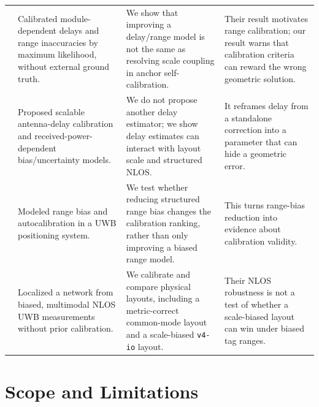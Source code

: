 \documentclass[11pt,a4paper]{article}
\begin{document}
\begin{center}
\begin{longtable}{@{}p{30mm}p{37mm}p{39mm}p{37mm}@{}}
\citet{ledergerber_2018_calibrating_away_inaccuracies_uwb} & Calibrated module-dependent delays and range inaccuracies by maximum likelihood, without external ground truth. & We show that improving a delay/range model is not the same as resolving scale coupling in anchor self-calibration. & Their result motivates range calibration; our result warns that calibration criteria can reward the wrong geometric solution. \\
\citet{shalaby_2023_calibration_and_uncertainty_char} & Proposed scalable antenna-delay calibration and received-power-dependent bias/uncertainty models. & We do not propose another delay estimator; we show delay estimates can interact with layout scale and structured NLOS. & It reframes delay from a standalone correction into a parameter that can hide a geometric error. \\
\citet{de_preter_2019_range_bias_modeling_autocalibration} & Modeled range bias and autocalibration in a UWB positioning system. & We test whether reducing structured range bias changes the calibration ranking, rather than only improving a biased range model. & This turns range-bias reduction into evidence about calibration validity. \\
\citet{difranco_2017_calibration_free_network_localization_nlos_uwb} & Localized a network from biased, multimodal NLOS UWB measurements without prior calibration. & We calibrate and compare physical layouts, including a metric-correct common-mode layout and a scale-biased \texttt{v4-io} layout. & Their NLOS robustness is not a test of whether a scale-biased layout can win under biased tag ranges. \\
\bottomrule
\end{longtable}
\end{center}

\section{Scope and Limitations}
\end{document}
